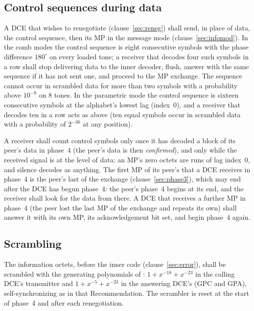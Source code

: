 \subsection{Control sequences during data}\label{sec:control}
A DCE that wishes to renegotiate (clause~\ref{sec:reneg}) shall send, in
place of data, the control sequence, then its MP in the message mode
(clause~\ref{sec:infomod}).  In the comb modes the control sequence is
eight consecutive symbols with the phase difference $180^\circ$ on every
loaded tone; a receiver that decodes four such symbols in a row shall
stop delivering data to the inner decoder, flush, answer with the same
sequence if it has not sent one, and proceed to the MP exchange.  The
sequence cannot occur in scrambled data for more than two symbols with a
probability above $10^{-9}$ on 8 tones.  In the parametric mode the
control sequence is sixteen consecutive symbols at the alphabet's lowest
lag (index~0), and a receiver that decodes ten in a row acts as above
(ten equal symbols occur in scrambled data with a probability of
$2^{-36}$ at any position).

A receiver shall count control symbols only once it has decoded a block
of its peer's data in phase~4 (the peer's data is then \emph{confirmed}),
and only while the received signal is at the level of data: an MP's zero
octets are runs of lag index~0, and silence decodes as anything.  The first MP of its peer's that a DCE
receives in phase~4 is the peer's last of the exchange (clause~\ref{sec:phase3}),
which may end after the DCE has begun phase~4: the peer's phase~4 begins
at its end, and the receiver shall look for the data from there.  A DCE
that receives a further MP in phase~4 (the peer lost the last MP of the
exchange and repeats its own) shall answer it with its own MP, its
acknowledgement bit set, and begin phase~4 again.

\subsection{Scrambling}
The information octets, before the inner code (clause~\ref{sec:error}),
shall be scrambled with the generating polynomials of : $1 + x^{-18} + x^{-23}$
in the calling DCE's transmitter and $1 + x^{-5} + x^{-23}$ in the
answering DCE's (GPC and GPA), self-synchronizing as in that
Recommendation.  The scrambler is reset at the start of phase~4 and after
each renegotiation.



